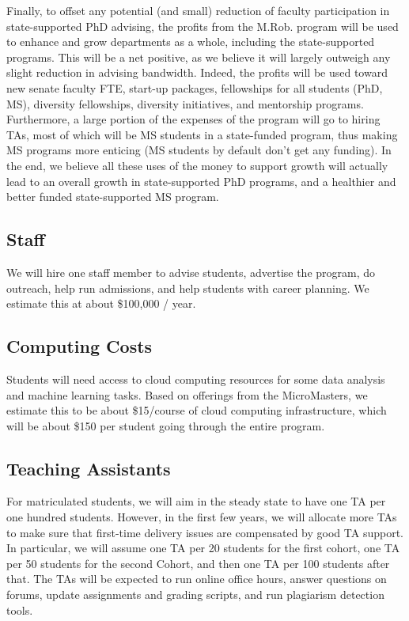 \documentclass[11pt,letterpaper]{article}
\begin{document}
Finally, to offset any potential (and small) reduction of faculty
participation in state-supported PhD advising, the profits from the
M.Rob. program will be used to enhance and grow departments as a
whole, including the state-supported programs. This will be a net
positive, as we believe it will largely outweigh any slight reduction
in advising bandwidth. Indeed, the profits will be used toward new
senate faculty FTE, start-up packages, fellowships for all students
(PhD, MS), diversity fellowships, diversity initiatives, and
mentorship programs. Furthermore, a large portion of the expenses of
the program will go to hiring TAs, most of which will be MS students
in a state-funded program, thus making MS programs more enticing (MS
students by default don’t get any funding). In the end, we believe all
these uses of the money to support growth will actually lead to an
overall growth in state-supported PhD programs, and a healthier and
better funded state-supported MS program.

\subsection{Staff}

We will hire one staff member to advise students, advertise the
program, do outreach, help run admissions, and help students with
career planning. We estimate this at about \$100,000 / year.


\subsection{Computing Costs}

Students will need access to cloud computing resources for some data
analysis and machine learning tasks. Based on offerings from the
MicroMasters, we estimate this to be about \$15/course of cloud
computing infrastructure, which will be about \$150 per student going
through the entire program.


\subsection{Teaching Assistants}

For matriculated students, we will aim in the steady state to have one
TA per one hundred students. However, in the first few years, we will
allocate more TAs to make sure that first-time delivery issues are
compensated by good TA support. In particular, we will assume one TA
per 20 students for the first cohort, one TA per 50 students for the
second Cohort, and then one TA per 100 students after that. The TAs
will be expected to run online office hours, answer questions on
forums, update assignments and grading scripts, and run plagiarism
detection tools. 
\end{document}
